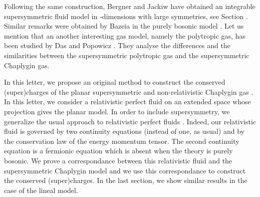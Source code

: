 \documentclass[11pt,a4paper]{article}
\begin{document}
Following the same construction, Bergner and Jackiw \cite{BJ} have
obtained an integrable supersymmetric fluid model in
\coordHE{}-dimensions with large symmetries, see Section \coordHE{}. Similar
remarks were obtained by Bazeia in the purely bosonic model
\cite{BB}. Let us mention that an another interesting gas model,
namely the polytropic gas, has been studied by Das and Popowicz
\cite{DAS}. They analyse the differences and the similarities between
the supersymmetric polytropic gas and the supersymmetric Chaplygin gas. 

In this letter, we propose an original method to construct the conserved (super)charges of the planar supersymmetric and non-relativistic Chaplygin gas \cite{JP}. In this letter, we consider a relativistic perfect fluid on an extended space whose projection gives the planar model. In order to include supersymmetry, we generalize the usual approach to relativistic perfect fluids \cite{LL}. Indeed, our relativistic fluid is governed by two continuity equations (instead of one, as usual) and by the conservation law of the energy momentum tensor. The second continuity equation is a fermionic equation which is absent when the theory is purely bosonic. We prove a correspondance between this relativistic fluid and the supersymmetric Chaplygin model and we use this correspondance to construct the conserved (super)charges. In the last section, we show similar results in the case of the lineal model.
\end{document}
